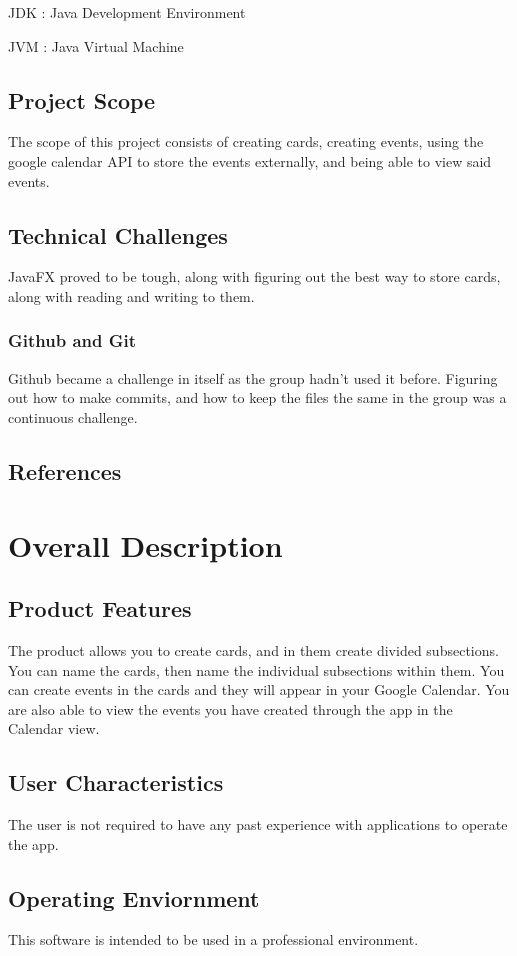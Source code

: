 \documentclass[12pt]{article}
\begin{document}
JDK : Java Development Environment

JVM : Java Virtual Machine 

\subsection{Project Scope}
The scope of this project consists of creating cards, creating events, using the google calendar API to store the events externally, and being able to view said events.

\subsection{Technical Challenges}
JavaFX proved to be tough, along with figuring out the best way to store cards, along with reading and writing to them.
\subsubsection{Github and Git}
Github became a challenge in itself as the group hadn't used it before. Figuring out how to make commits, and how to keep the files the same in the group was a continuous challenge.

\subsection{References}

\section{Overall Description}
\subsection{Product Features}
The product allows you to create cards, and in them create divided subsections. You can name the cards, then name the individual subsections within them. You can create events in the cards and they will appear in your Google Calendar. You are also able to view the events you have created through the app in the Calendar view.

\subsection{User Characteristics}
The user is not required to have any past experience with applications to operate the app.

\subsection{Operating Enviornment}
This software is intended to be used in a professional environment.
\end{document}
